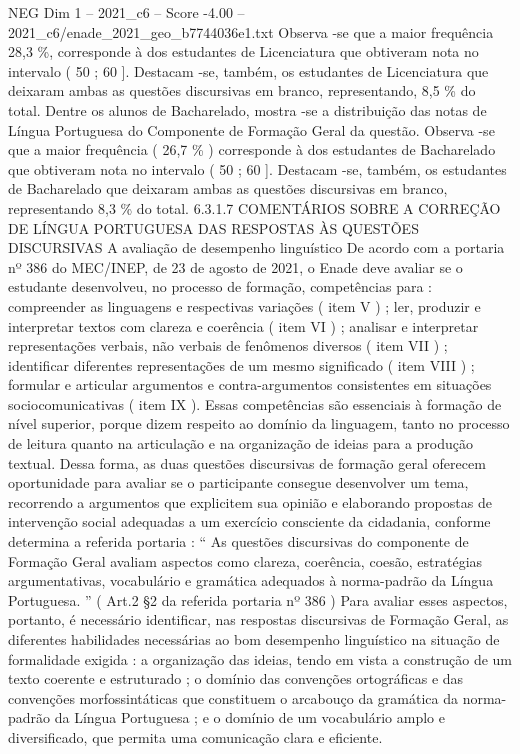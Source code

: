 \begin{textsample}{NEG Dim 1 – 2021\_c6 – Score -4.00 – 2021\_c6/enade\_2021\_geo\_b7744036e1.txt}
Observa -se que a maior frequência 28,3 \%, corresponde à dos estudantes de Licenciatura que obtiveram nota no intervalo ( 50 ; 60 ].
Destacam -se, também, os estudantes de Licenciatura que deixaram ambas as questões discursivas em branco, representando, 8,5 \% do total.
Dentre os alunos de Bacharelado, mostra -se a distribuição das notas de Língua Portuguesa do Componente de Formação Geral da questão.
Observa -se que a maior frequência ( 26,7 \% ) corresponde à dos estudantes de Bacharelado que obtiveram nota no intervalo ( 50 ; 60 ].
Destacam -se, também, os estudantes de Bacharelado que deixaram ambas as questões discursivas em branco, representando 8,3 \% do total. 6.3.1.7 COMENTÁRIOS SOBRE A CORREÇÃO DE LÍNGUA PORTUGUESA DAS RESPOSTAS ÀS QUESTÕES DISCURSIVAS A avaliação de desempenho linguístico De acordo com a portaria nº 386 do MEC/INEP, de 23 de agosto de 2021, o Enade deve avaliar se o estudante desenvolveu, no processo de formação, competências para : compreender as linguagens e respectivas variações ( item V ) ; ler, produzir e interpretar textos com clareza e coerência ( item VI ) ; analisar e interpretar representações verbais, não verbais de fenômenos diversos ( item VII ) ; identificar diferentes representações de um mesmo significado ( item VIII ) ; formular e articular argumentos e contra-argumentos consistentes em situações sociocomunicativas ( item IX ).
Essas competências são essenciais à formação de nível superior, porque dizem respeito ao domínio da linguagem, tanto no processo de leitura quanto na articulação e na organização de ideias para a produção textual.
Dessa forma, as duas questões discursivas de formação geral oferecem oportunidade para avaliar se o participante consegue desenvolver um tema, recorrendo a argumentos que explicitem sua opinião e elaborando propostas de intervenção social adequadas a um exercício consciente da cidadania, conforme determina a referida portaria : “ As questões discursivas do componente de Formação Geral avaliam aspectos como clareza, coerência, coesão, estratégias argumentativas, vocabulário e gramática adequados à norma-padrão da Língua Portuguesa. ” ( Art.2 §2 da referida portaria nº 386 ) Para avaliar esses aspectos, portanto, é necessário identificar, nas respostas discursivas de Formação Geral, as diferentes habilidades necessárias ao bom desempenho linguístico na situação de formalidade exigida : a organização das ideias, tendo em vista a construção de um texto coerente e estruturado ; o domínio das convenções ortográficas e das convenções morfossintáticas que constituem o arcabouço da gramática da norma-padrão da Língua Portuguesa ; e o domínio de um vocabulário amplo e diversificado, que permita uma comunicação clara e eficiente.

\end{textsample}
